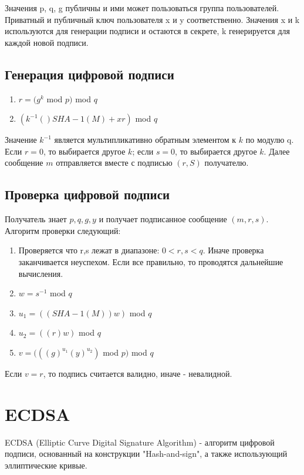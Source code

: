 \documentclass[colorthm]{./civarticle}
\begin{document}
Значения p, q, g публичны и ими может пользоваться группа пользователей. Приватный и публичный ключ пользователя x и y соответственно. Значения x и k используются для генерации подписи и остаются в секрете, k генерируется для каждой новой подписи. 

\subsection{Генерация цифровой подписи}

\begin{enumerate}
    \item $r = (g^k $ mod $ p) $ mod $ q$
    \item $(k^{-1}()SHA-1(M) + xr) $ mod $ q$
\end{enumerate}

Значение $k^{-1}$ является мультипликативно обратным элементом к $k$ по модулю q. Если $r=0$, то выбирается другое $k$; если $s=0$, то выбирается другое $k$. Далее сообщение $m$ отправляется вместе с подписью $(r, S)$ получателю.

\subsection{Проверка цифровой подписи}

Получатель знает $p, q, g, y$ и получает подписанное сообщение $(m, r, s)$. Алгоритм проверки следующий:

\begin{enumerate}
    \item Проверяется что r,s лежат в диапазоне: $0 < r, s < q$. Иначе проверка заканчивается неуспехом. Если все правильно, то проводятся дальнейшие вычисления.
    \item $w = s^{-1} $ mod $ q$
    \item $u_1 = ((SHA-1(M))w) $ mod $ q$
    \item $u_2 = ((r)w) $ mod $ q$
    \item $v = (((g)^{u_1}(y)^{u_2}) $ mod $ p) $ mod $ q$
\end{enumerate}

Если $v=r$, то подпись считается валидно, иначе - невалидной.


\section{ECDSA}
ECDSA (Elliptic Curve Digital Signature Algorithm) - алгоритм цифровой подписи, основанный на конструкции "Hash-and-sign", а также использующий эллиптические кривые.
\end{document}
